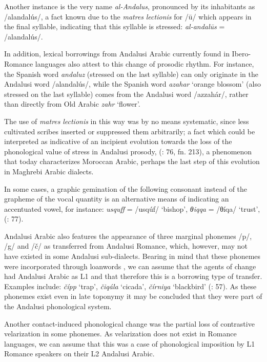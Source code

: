 \documentclass[output=paper,modfonts,nonflat]{langsci/langscibook}
\begin{document}
Another instance is the very name \textit{al-Andalus}, pronounced by its inhabitants as /alandalús/, a fact known due to the \textit{matres} \textit{lectionis} for /ū/ which appears in the final syllable, indicating that this syllable is stressed: {} \textit{al-andalūs} = /alandalús/.

In addition, lexical borrowings from Andalusi Arabic currently found in Ibero-Romance languages also attest to this change of prosodic rhythm. For instance, the Spanish word \textit{andaluz} (stressed on the last syllable) can only originate in the Andalusi word /alandalús/, while the Spanish word \textit{azahar} ‘orange blossom’ (also stressed on the last syllable) comes from the Andalusi word /azzahár/, rather than directly from Old Arabic \textit{zahr} ‘flower’.

The use of \textit{matres} \textit{lectionis} in this way was by no means systematic, since {less cultivated scribes inserted or suppressed them arbitrarily}; a fact which could be interpreted as indicative of an incipient evolution towards the loss of the phonological value of stress in Andalusi prosody, (\citealt{CorrientePereiraVicente2015}: 76, fn. 213), a phenomenon that today characterizes Moroccan Arabic, perhaps the last step of this evolution in Maghrebi Arabic dialects.

{In some cases, a graphic gemination of the following consonant instead of the grapheme of the vocal quantity is an alternative means of indicating an accentuated vowel, for instance: \textcolor{red}{{}} \textit{usquff} = /usqúf/ ‘bishop’, \textcolor{red}{{}} \textit{θiqqa} = /θíqa/ ‘trust’,} {(\citealt{CorrientePereiraVicente2015}: 77)}{.} 

Andalusi Arabic also features the appearance of three marginal phonemes /p/, /g/ and /č/ as transferred from Andalusi Romance, which, however, may not have existed in some Andalusi sub-dialects. Bearing in mind that these phonemes were incorporated through loanwords \citep{Corriente1978}, we can assume that the agents of change had Andalusi Arabic as L1 and that therefore this is a borrowing type of transfer. Examples include: \textit{čípp} ‘trap’, \textit{čiqála} ‘cicada’, \textit{čírniya} ‘blackbird’ (\citealt{CorrientePereiraVicente2015}: 57). As these phonemes exist even in late toponymy it may be concluded that they were part of the Andalusi phonological system. 

Another contact-induced phonological change was the partial loss of contrastive velarization in some phonemes. As velarization does not exist in Romance languages, we can assume that this was a case of phonological imposition by L1 Romance speakers on their L2 Andalusi Arabic. 
\end{document}
